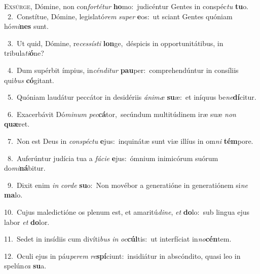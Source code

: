 \lettrine{\initial\textcolor{\initialcolor}{E}}{xsúrge,} Dómine, non con\-\textit{for}\-\textit{té}\textit{tur} \textbf{ho}\-mo:~\star judicéntur Gentes in conspéc\textit{tu} \textbf{tu}\-o.\\
{\numbfont\textcolor{\numbcolor}{~2.}}~Constítue, Dómine, legislató\textit{rem} \textit{su}\-\textit{per} \textbf{e}\-os:~\star ut sciant Gentes quóniam hó\-\textit{mi}\-\textbf{nes} sunt.\par
{\numbfont\textcolor{\numbcolor}{~3.}}~Ut quid, Dómine, re\-\textit{ces}\-\textit{sís}\textit{ti} \textbf{lon}\-ge,~\star déspicis in opportunitátibus, in tribula\-\textit{ti}\-\textbf{ó}ne?\par
{\numbfont\textcolor{\numbcolor}{~4.}}~Dum supérbit ímpius, in\-\textit{cén}\-\textit{di}\textit{tur} \textbf{pau}\-per:~\star comprehendúntur in consíliis qui\textit{bus} \textbf{có}\-gitant.\par
{\numbfont\textcolor{\numbcolor}{~5.}}~Quóniam laudátur peccátor in desidériis \textit{á}\-\textit{ni}\textit{mæ} \textbf{su}\-æ:~\star et iníquus be\-\textit{ne}\-\textbf{dí}citur.\par
{\numbfont\textcolor{\numbcolor}{~6.}}~Exacerbávit Dó\-\textit{mi}\-\textit{num} \textit{pec}\-\textbf{cá}tor,~\star secúndum multitúdinem iræ suæ \textit{non} \textbf{quæ}\-ret.\par
{\numbfont\textcolor{\numbcolor}{~7.}}~Non est Deus in \textit{con}\-\textit{spéc}\textit{tu} \textbf{e}\-jus:~\star inquinátæ sunt viæ illíus in om\textit{ni} \textbf{tém}\-pore.\par
{\numbfont\textcolor{\numbcolor}{~8.}}~Auferúntur judícia tua a \textit{fá}\-\textit{ci}\textit{e} \textbf{e}\-jus:~\star ómnium inimicórum suórum do\-\textit{mi}\-\textbf{ná}bitur.\par
{\numbfont\textcolor{\numbcolor}{~9.}}~Dixit enim \textit{in} \textit{cor}\-\textit{de} \textbf{su}\-o:~\star Non movébor a generatióne in generatiónem si\textit{ne} \textbf{ma}\-lo.\par
{\numbfont\textcolor{\numbcolor}{10.}}~Cujus maledictióne os plenum est, et amaritú\-\textit{di}\-\textit{ne}, \textit{et} \textbf{do}\-lo:~\star sub lingua ejus labor \textit{et} \textbf{do}\-lor.\par
{\numbfont\textcolor{\numbcolor}{11.}}~Sedet in insídiis cum divíti\textit{bus} \textit{in} \textit{oc}\-\textbf{cúl}tis:~\star ut interfíciat in\-\textit{no}\-\textbf{cén}tem.\par
{\numbfont\textcolor{\numbcolor}{12.}}~Oculi ejus in páu\-\textit{pe}\-\textit{rem} \textit{re}\-\textbf{spí}ciunt:~\star insidiátur in abscóndito, quasi leo in spelún\textit{ca} \textbf{su}\-a.\par
